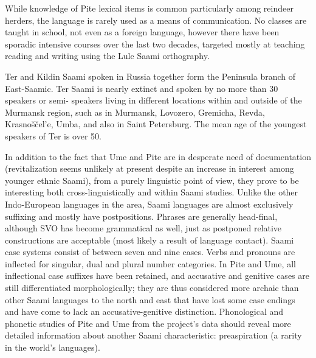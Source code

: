 \documentclass[a4paper,12pt]{article}
\begin{document}
While knowledge of Pite lexical items is common particularly among reindeer herders, the language is rarely used as a means of communication. No classes are taught in school, not even as a foreign language, however there have been sporadic intensive courses over the last two decades, targeted mostly at teaching reading and writing using the Lule Saami orthography.

Ter and Kildin Saami spoken in Russia together form the Peninsula branch of East-Saamic. Ter Saami is nearly extinct and spoken by no more than 30 speakers or semi- speakers living in different locations within and outside of the Murmansk region, such as in Murmansk, Lovozero, Gremicha, Revda, Krasnoščel'e, Umba, and also in Saint Petersburg. The mean age of the youngest speakers of Ter is over 50.



In addition to the fact that Ume and Pite are in desperate need of documentation (revitalization seems unlikely at present despite an increase in interest among younger ethnic Saami), from a purely linguistic point of view, they prove to be interesting both cross-linguistically and within Saami studies. Unlike the other Indo-European languages in the area, Saami languages are almost exclusively suffixing and mostly have postpositions. Phrases are generally head-final, although SVO has become grammatical as well, just as postponed relative constructions are acceptable (most likely a result of language contact). Saami case systems consist of between seven and nine cases. Verbs and pronouns are inflected for singular, dual and plural number categories. In Pite and Ume, all inflectional case suffixes have been retained, and accusative and genitive cases are still differentiated morphologically; they are thus considered more archaic than other Saami languages to the north and east that have lost some case endings and have come to lack an accusative-genitive distinction. Phonological and phonetic studies of Pite and Ume from the project's data should reveal more detailed information about another Saami characteristic: preaspiration (a rarity in the world's languages).
\end{document}
